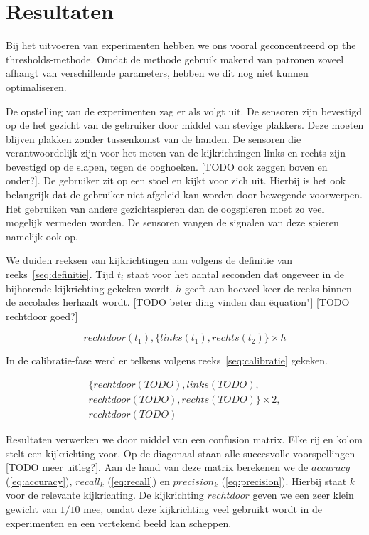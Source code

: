 \documentclass{article}
\begin{document}
\section{Resultaten}
Bij het uitvoeren van experimenten hebben we ons vooral geconcentreerd op the thresholds-methode. Omdat de methode gebruik makend van patronen zoveel afhangt van verschillende parameters, hebben we dit nog niet kunnen optimaliseren.

De opstelling van de experimenten zag er als volgt uit. De sensoren zijn bevestigd op de het gezicht van de gebruiker door middel van stevige plakkers. Deze moeten blijven plakken zonder tussenkomst van de handen. De sensoren die verantwoordelijk zijn voor het meten van de kijkrichtingen links en rechts zijn bevestigd op de slapen, tegen de ooghoeken. [TODO ook zeggen boven en onder?]. De gebruiker zit op een stoel en kijkt voor zich uit. Hierbij is het ook belangrijk dat de gebruiker niet afgeleid kan worden door bewegende voorwerpen. Het gebruiken van andere gezichtsspieren dan de oogspieren moet zo veel mogelijk vermeden worden. De sensoren vangen de signalen van deze spieren namelijk ook op.

We duiden reeksen van kijkrichtingen aan volgens de definitie van reeks~\ref{seq:definitie}. Tijd $t_i$ staat voor het aantal seconden dat ongeveer in de bijhorende kijkrichting gekeken wordt. $h$ geeft aan hoeveel keer de reeks binnen de accolades herhaalt wordt. [TODO beter ding vinden dan \"equation"] [TODO rechtdoor goed?]

\begin{equation}
\label{seq:definitie}
rechtdoor(t_1), \{ links (t_1), rechts (t_2) \} \times h
\end{equation}

In de calibratie-fase werd er telkens volgens reeks~\ref{seq:calibratie} gekeken.

\begin{equation}
\label{seq:calibratie}
\begin{aligned}
&\{rechtdoor(TODO), links(TODO), &\\
&rechtdoor(TODO), rechts(TODO)\} \times 2, &\\
& rechtdoor(TODO)&
\end{aligned}
\end{equation}

Resultaten verwerken we door middel van een confusion matrix. Elke rij en kolom stelt een kijkrichting voor. Op de diagonaal staan alle succesvolle voorspellingen [TODO meer uitleg?]. Aan de hand van deze matrix berekenen we de $accuracy$ (\ref{eq:accuracy}), $recall_k$ (\ref{eq:recall}) en $precision_k$ (\ref{eq:precision}). Hierbij staat $k$ voor de relevante kijkrichting. De kijkrichting $rechtdoor$ geven we een zeer klein gewicht van $1/10$ mee, omdat deze kijkrichting veel gebruikt wordt in de experimenten en een vertekend beeld kan scheppen.
\end{document}
